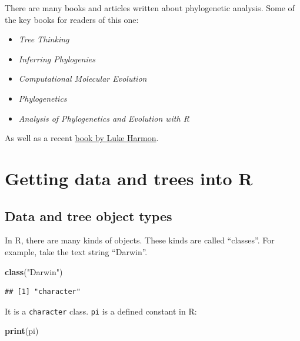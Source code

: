 \documentclass[
]{article}
\newenvironment{Shaded}{\begin{snugshade}}{\end{snugshade}}
\newcommand{\KeywordTok}[1]{\textcolor[rgb]{0.13,0.29,0.53}{\textbf{#1}}}
\newcommand{\NormalTok}[1]{#1}
\newcommand{\StringTok}[1]{\textcolor[rgb]{0.31,0.60,0.02}{#1}}
\providecommand{\tightlist}{%
  \setlength{\itemsep}{0pt}\setlength{\parskip}{0pt}}
\begin{document}
There are many books and articles written about phylogenetic analysis. Some of the key books for readers of this one:

\begin{itemize}
\tightlist
\item
  \emph{Tree Thinking} \citep{BaumTreethinkingintroduction2013}
\item
  \emph{Inferring Phylogenies} \citep{felsenstein_inferring_2004}
\item
  \emph{Computational Molecular Evolution} \citep{YangComputationalmolecularevolution2006}
\item
  \emph{Phylogenetics} \citep{SemplePhylogenetics2003}
\item
  \emph{Analysis of Phylogenetics and Evolution with R} \citep{ParadisAnalysisPhylogeneticsEvolution2011}
\end{itemize}

As well as a recent \href{https://lukejharmon.github.io/pcm/chapters/}{book by Luke Harmon}.

\hypertarget{getting-data-and-trees-into-r}{%
\section{Getting data and trees into R}\label{getting-data-and-trees-into-r}}

\hypertarget{data-and-tree-object-types}{%
\subsection{Data and tree object types}\label{data-and-tree-object-types}}

In R, there are many kinds of objects. These kinds are called ``classes''. For example, take the text string ``Darwin''.

\begin{Shaded}
\begin{Highlighting}[]
\KeywordTok{class}\NormalTok{(}\StringTok{"Darwin"}\NormalTok{)}
\end{Highlighting}
\end{Shaded}

\begin{verbatim}
## [1] "character"
\end{verbatim}

It is a \texttt{character} class. \texttt{pi} is a defined constant in R:

\begin{Shaded}
\begin{Highlighting}[]
\KeywordTok{print}\NormalTok{(pi)}
\end{Highlighting}
\end{Shaded}
\end{document}
